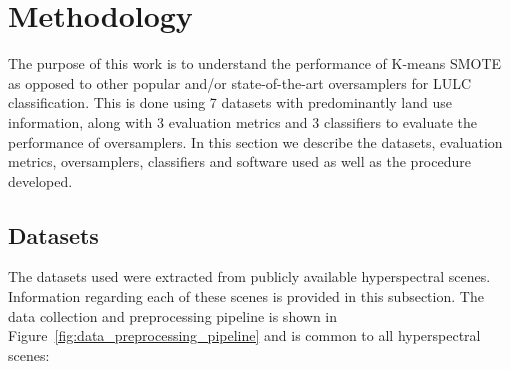 \section{Methodology}\label{sec:methodology-kmeans}

The purpose of this work is to understand the performance of K-means SMOTE as
opposed to other popular and/or state-of-the-art oversamplers for LULC
classification. This is done using 7 datasets with predominantly land use
information, along with 3 evaluation metrics and 3 classifiers to evaluate the
performance of oversamplers. In this section we describe the datasets,
evaluation metrics, oversamplers, classifiers and software used as well as the
procedure developed.

\subsection{Datasets}

The datasets used were extracted from publicly available hyperspectral scenes.
Information regarding each of these scenes is provided in this subsection.
The data collection and preprocessing pipeline is shown in
Figure~\ref{fig:data_preprocessing_pipeline} and is common to all
hyperspectral scenes:


